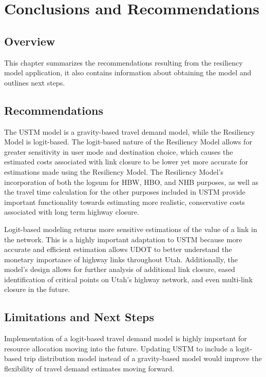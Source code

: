 \chapter{Conclusions and Recommendations}
\label{chp:chapter5}
\graphicspath{{figures/}{figures/chapter5/}}

\section{Overview}

This chapter summarizes the recommendations resulting from the resiliency
model application, it also contains information about obtaining the model and
outlines next steps.

\section{Recommendations}

The USTM model is a gravity-based travel demand model, while the Resiliency
Model is logit-based. The logit-based nature of the Resiliency Model allows
for greater sensitivity in user mode and destination choice, which causes
the estimated costs associated with link closure to be lower yet more
accurate for estimations made using the Resiliency Model. The Resiliency
Model's incorporation of both the logsum for HBW, HBO, and NHB purposes, as
well as the travel time calculation for the other purposes included in USTM
provide important functionality towards estimating more realistic, conservative costs
associated with long term highway closure.

Logit-based modeling returns more sensitive
estimations of the value of a link in the network. This is a highly
important adaptation to USTM because more accurate and efficient estimation allows
UDOT to better understand the monetary importance of highway links
throughout Utah. Additionally, the model’s design allows for further
analysis of additional link closure, eased identification of critical
points on Utah's highway network, and even multi-link closure in the
future.

\section{Limitations and Next Steps}

Implementation of a logit-based travel demand model is highly important for resource allocation moving into the future. Updating USTM to include a logit-based trip distribution model instead of a gravity-based model would improve the flexibility of travel demand estimates moving forward.

